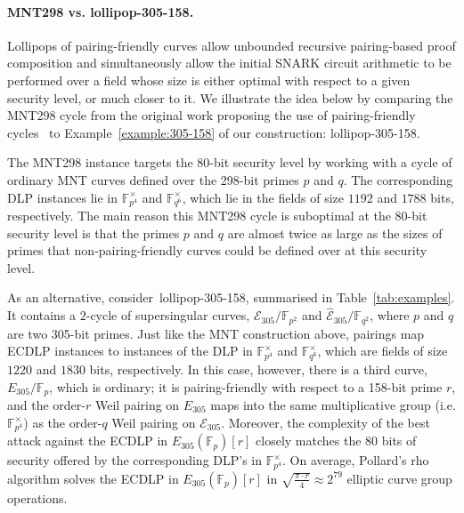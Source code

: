 \documentclass[version=preprint]{iacrcc}
\newcommand{\F}{\mathbb{F}}
\newcommand{\EC}{\mathcal{E}}
\begin{document}
\paragraph{\textsf{MNT298} vs. \textsf{lollipop-305-158}.} Lollipops of pairing-friendly curves allow unbounded recursive pairing-based proof composition and simultaneously allow the initial SNARK circuit arithmetic to be performed over a field whose size is either optimal with respect to a given security level, or much closer to it. We illustrate the idea below by comparing the \textsf{MNT298} cycle from the original work proposing the use of pairing-friendly cycles~\cite{scalable} to Example~\ref{example:305-158} of our construction: \textsf{lollipop-305-158}. 

The \textsf{MNT298} instance targets the 80-bit security level by working with a cycle of ordinary MNT curves defined over the 298-bit primes $p$ and $q$. The corresponding DLP instances lie in $\F_{p^4}^\times$ and $\F_{q^6}^\times$, which lie in the fields of size $1192$ and $1788$ bits, respectively. The main reason this \textsf{MNT298} cycle is suboptimal at the 80-bit security level is that the primes $p$ and $q$ are almost twice as large as the sizes of primes that non-pairing-friendly curves could be defined over at this security level. 

As an alternative, consider~\textsf{lollipop-305-158}, summarised in Table~\ref{tab:examples}. It contains a $2$-cycle of supersingular curves, ${\EC}_{305}/\F_{p^2}$ and $\hat{\EC}_{305}/\F_{q^2}$, where $p$ and $q$ are two 305-bit primes. Just like the MNT construction above, pairings map ECDLP instances to instances of the DLP in $\F_{p^4}^\times$ and $\F_{q^6}^\times$, which are fields of size $1220$ and $1830$ bits, respectively. In this case, however, there is a third curve, $E_{305}/\F_p$, which is ordinary; it is pairing-friendly with respect to a 158-bit prime $r$, and the order-$r$ Weil pairing on $E_{305}$ maps into the same multiplicative group (i.e. $\F_{p^4}^\times$) as the order-$q$ Weil pairing on ${\EC}_{305}$. Moreover, the complexity of the best attack against the ECDLP in $E_{305}(\F_p)[r]$ closely matches the $80$ bits of security offered by the corresponding DLP's in $\F_{p^4}^\times$. On average, Pollard's rho~\cite{pollard1978monte} algorithm solves the ECDLP in $E_{305}(\F_p)[r]$ in $\sqrt{\frac{\pi \cdot r}{4}} \approx 2^{79}$ elliptic curve group operations. 
\end{document}
